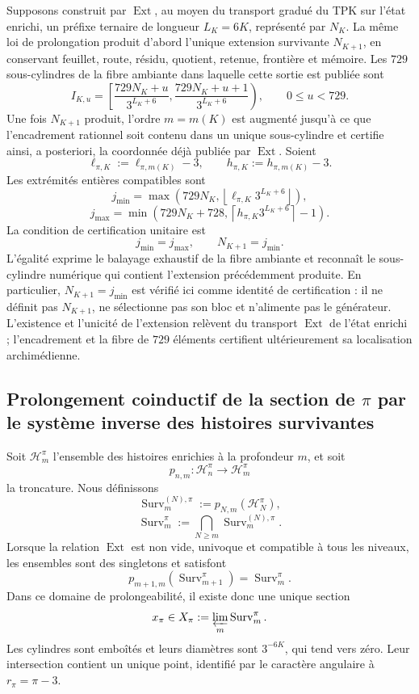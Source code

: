 Supposons construit par \(\operatorname{Ext}\), au moyen du transport
gradué du TPK sur l'état enrichi, un préfixe ternaire de longueur
\(L_K=6K\), représenté par \(N_K\). La même loi de prolongation produit
d'abord l'unique extension survivante \(N_{K+1}\), en conservant feuillet,
route, résidu, quotient, retenue, frontière et mémoire. Les \(729\)
sous-cylindres de la fibre ambiante dans laquelle cette sortie est publiée sont
\[
 I_{K,u}=
 \left[
 \frac{729N_K+u}{3^{L_K+6}},
 \frac{729N_K+u+1}{3^{L_K+6}}
 \right),
 \qquad0\leq u<729.
\]
Une fois \(N_{K+1}\) produit, l'ordre \(m=m(K)\) est augmenté jusqu'à ce que
l'encadrement rationnel soit contenu dans un unique sous-cylindre et certifie ainsi,
a posteriori, la coordonnée déjà publiée par \(\operatorname{Ext}\). Soient
\[
 \ell_{\pi,K}:=\ell_{\pi,m(K)}-3,
 \qquad
 h_{\pi,K}:=h_{\pi,m(K)}-3.
\]
Les extrémités entières compatibles sont
\[
 j_{\min}=
 \max\!\left(
 729N_K,\left\lfloor
 \ell_{\pi,K}3^{L_K+6}\right\rfloor
 \right),
\]
\[
 j_{\max}=
 \min\!\left(
 729N_K+728,\left\lceil
 h_{\pi,K}3^{L_K+6}\right\rceil-1
 \right).
\]
La condition de certification unitaire est
\begin{equation}
 \boxed{j_{\min}=j_{\max},\qquad N_{K+1}=j_{\min}.}
 \label{p12-83-c8-s1:eq:seleccion-unitaria-subcilindro-pi}
\end{equation}
L'égalité exprime le balayage exhaustif de la fibre ambiante et reconnaît le
sous-cylindre numérique qui contient l'extension précédemment produite. En
particulier, \(N_{K+1}=j_{\min}\) est vérifié ici comme identité de
certification : il ne définit pas \(N_{K+1}\), ne sélectionne pas son bloc et n'alimente pas le
générateur. L'existence et l'unicité de l'extension relèvent du
transport \(\operatorname{Ext}\) de l'état enrichi ; l'encadrement et la
fibre de \(729\) éléments certifient ultérieurement sa localisation
archimédienne.

\subsection{Prolongement coinductif de la section de \(\pi\) par le système inverse des histoires survivantes}

Soit \(\mathcal H_m^\pi\) l’ensemble des histoires enrichies à la profondeur
\(m\), et soit
\[
 p_{n,m}:\mathcal H_n^\pi\longrightarrow\mathcal H_m^\pi
\]
la troncature. Nous définissons
\[
 \operatorname{Surv}_m^{(N),\pi}
 :=p_{N,m}(\mathcal H_N^\pi),
\]
\[
 \operatorname{Surv}_m^\pi
 :=\bigcap_{N\geq m}\operatorname{Surv}_m^{(N),\pi}.
\]
Lorsque la relation \(\operatorname{Ext}\) est non vide, univoque et
compatible à tous les niveaux, les ensembles sont des singletons et satisfont
\[
 p_{m+1,m}(\operatorname{Surv}_{m+1}^{\pi})
 =\operatorname{Surv}_{m}^{\pi}.
\]
Dans ce domaine de prolongeabilité, il existe donc une unique section
\[
 x_\pi\in
 X_\pi:=\varprojlim_m\operatorname{Surv}_m^\pi.
\]
Les cylindres sont emboîtés et leurs diamètres sont \(3^{-6K}\), qui tend vers
zéro. Leur intersection contient un unique point, identifié par le caractère
angulaire à \(r_\pi=\pi-3\).

